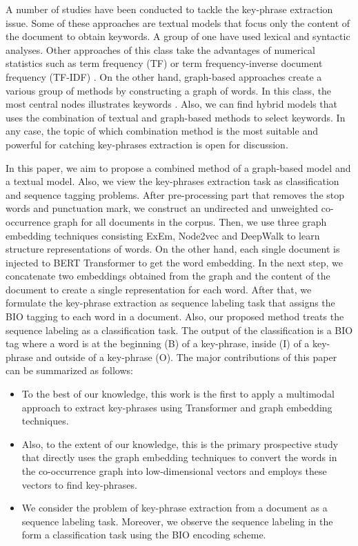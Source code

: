 \documentclass[review,3p]{elsarticle}
\begin{document}
A number of studies have been conducted to tackle the key-phrase extraction issue. Some of these approaches are textual models that focus only the content of the document to obtain keywords. A group of one have used lexical and syntactic analyses. Other approaches of this class take the advantages of numerical statistics such as term frequency (TF) or term frequency-inverse document frequency (TF-IDF) \cite{wang2019detecting}.  On the other hand, graph-based approaches create a various group of methods by constructing a graph of words. In this class, the most central nodes illustrates keywords \cite{vega2019multi}. Also, we can find hybrid models  that uses the combination of textual and graph-based methods to select keywords. In any case, the topic of which combination method is the most suitable and powerful for catching key-phrases extraction is open for discussion. 

In this paper, we aim to propose a combined method of a graph-based model and a textual model. Also, we view the key-phrases extraction task as classification and sequence tagging problems. After pre-processing part that removes the stop words and punctuation mark, we construct an undirected and unweighted co-occurrence graph for all documents in the corpus. Then, we use three graph embedding techniques consisting ExEm, Node2vec and DeepWalk to learn structure representations of words. On the other hand, each single document is injected to BERT Transformer to get the word embedding. In the next step, we concatenate two embeddings obtained from the graph and the content of the document to create a single representation for each word. After that, we formulate the key-phrase extraction as sequence labeling task that assigns the BIO tagging to each word in a document. Also, our proposed method treats the sequence labeling as a classification task.  The output of the classification is a BIO tag where a word is at the beginning (B) of a key-phrase, inside (I) of a key-phrase and outside of a key-phrase (O). The major contributions of this paper can be summarized as follows:

\begin{itemize}
  \item To the best of our knowledge, this work is the first to apply a multimodal approach to extract key-phrases using Transformer and graph embedding techniques.
  \item Also, to the extent of our knowledge, this is the primary prospective study that directly uses the graph embedding techniques to convert the words in the co-occurrence graph into low-dimensional vectors and employs these vectors to find key-phrases.
 \item We consider the problem of key-phrase extraction from a document as a sequence labeling task. Moreover, we observe the sequence labeling in the form a classification task using the BIO encoding scheme.
\end{itemize}
\end{document}
